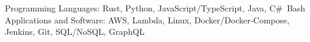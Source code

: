 
\begin{cvskills}
  \cvskill
    {Programming Languages:} %
    {Rust, Python, JavaScript/TypeScript, Java, C\#\ Bash} %
  \cvskill
    {Applications and Software:} %
    {AWS, Lambda, Linux, Docker/Docker‑Compose, Jenkins, Git, SQL/NoSQL, GraphQL} %
\end{cvskills}
